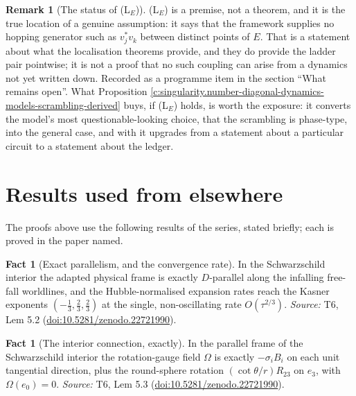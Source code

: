 \documentclass[11pt]{article}
\theoremstyle{definition}
\newtheorem{fact}[theorem]{Fact}
\newtheorem{remark}[theorem]{Remark}
\theoremstyle{plain}
\newcommand{\changedmark}[2]{\marginpar{\raggedright\scriptsize\color{#1}#2}}
\begin{document}
\begin{remark}[The status of (L$_E$)]\label{c:note.state-selection.status-l-e}
\changedmark{MidnightBlue}{added since the deposit}
(L$_E$) is a premise, not a theorem, and it is the true location of a genuine assumption: it says that the framework supplies no hopping generator such as $v_j^{*}v_k$ between distinct points of $E$. That is a statement about what the localisation theorems provide, and they do provide the ladder pair pointwise; it is not a proof that no such coupling can arise from a dynamics not yet written down. Recorded as a programme item in the section ``What remains open''. What Proposition \ref{c:singularity.number-diagonal-dynamics-models-scrambling-derived} buys, if (L$_E$) holds, is worth the exposure: it converts the model's most questionable-looking choice, that the scrambling is phase-type, into the general case, and with it upgrades \cite[Lem.~12.1]{ButlerT5} from a statement about a particular circuit to a statement about the ledger.
\end{remark}

\section{Results used from elsewhere}
The proofs above use the following results of the series, stated briefly; each is proved in the paper named.

\begin{fact}[Exact parallelism, and the convergence rate]\label{c:interior.exact-parallelism-convergence-rate}
In the Schwarzschild interior the adapted physical frame is exactly $D$-parallel along the infalling free-fall worldlines, and the Hubble-normalised expansion rates reach the Kasner exponents $(-\tfrac13, \tfrac23, \tfrac23)$ at the single, non-oscillating rate $O(\tau^{2/3})$.
\emph{Source:} T6, Lem 5.2 (\href{https://doi.org/10.5281/zenodo.22721990}{doi:10.5281/zenodo.22721990}).
\end{fact}

\begin{fact}[The interior connection, exactly]\label{c:interior.interior-connection-exactly}
In the parallel frame of the Schwarzschild interior the rotation-gauge field $\Omega$ is exactly $-\sigma_i B_i$ on each unit tangential direction, plus the round-sphere rotation $(\cot\theta/r)R_{23}$ on $e_3$, with $\Omega(e_0) = 0$.
\emph{Source:} T6, Lem 5.3 (\href{https://doi.org/10.5281/zenodo.22721990}{doi:10.5281/zenodo.22721990}).
\end{fact}
\end{document}
